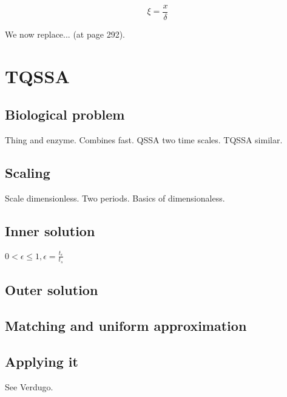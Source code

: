 \documentclass[12pt]{report}
\begin{document}
$$\xi = \frac x \delta$$

We now replace... (at page 292).

\chapter{TQSSA}

\section{Biological problem}

Thing and enzyme. Combines fast. QSSA two time scales. TQSSA similar.

\section{Scaling}

Scale dimensionless. Two periods. Basics of dimensionaless.

\section{Inner solution}

$0 < \epsilon \leq 1, \epsilon = \frac{t_{\epsilon}}{t_{s}}$

\section{Outer solution}

\section{Matching and uniform approximation}

\section{Applying it}

See Verdugo.


\end{document}
